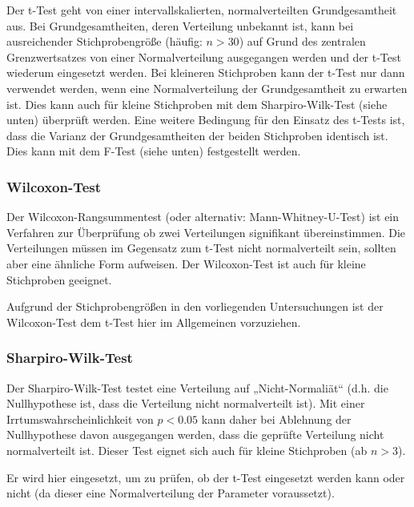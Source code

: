 Der t-Test geht von einer intervallskalierten, normalverteilten Grundgesamtheit aus. Bei Grundgesamtheiten, deren Verteilung unbekannt ist, kann bei ausreichender Stichprobengröße (häufig: $n>30$) auf Grund des zentralen Grenzwertsatzes von einer Normalverteilung ausgegangen werden und der t-Test wiederum eingesetzt werden. Bei kleineren Stichproben kann der t-Test nur dann verwendet werden, wenn eine Normalverteilung der Grundgesamtheit zu erwarten ist. Dies kann auch für kleine Stichproben mit dem Sharpiro-Wilk-Test (siehe unten) überprüft werden. Eine weitere Bedingung für den Einsatz des t-Tests ist, dass die Varianz der Grundgesamtheiten der beiden Stichproben identisch ist. Dies kann mit dem F-Test (siehe unten) festgestellt werden.  \citet{Bortz03}


\subsubsection{Wilcoxon-Test} %
\label{ssub:wilcoxon_text}
Der Wilcoxon-Rangsummentest (oder alternativ: Mann-Whitney-U-Test) ist ein Verfahren zur Überprüfung ob zwei Verteilungen signifikant übereinstimmen. Die Verteilungen müssen im Gegensatz zum t-Test nicht normalverteilt sein, sollten aber eine ähnliche Form aufweisen. Der Wilcoxon-Test ist auch für kleine Stichproben geeignet. \citep{Duller08}

Aufgrund der Stichprobengrößen in den vorliegenden Untersuchungen ist der Wilcoxon-Test dem t-Test hier im Allgemeinen vorzuziehen. 


\subsubsection{Sharpiro-Wilk-Test} %
\label{ssub:sharpiro_wilk_test}

Der Sharpiro-Wilk-Test \citep{Shapiro65} testet eine Verteilung auf „Nicht-Normaliät“ (d.h. die Nullhypothese ist, dass die Verteilung nicht normalverteilt ist). Mit einer Irrtumswahrscheinlichkeit von $p<0.05$ kann daher bei Ablehnung der Nullhypothese davon ausgegangen werden, dass die geprüfte Verteilung nicht normalverteilt ist. Dieser Test eignet sich auch für kleine Stichproben (ab $n>3$). \citep{Duller08}

Er wird hier eingesetzt, um zu prüfen, ob der t-Test eingesetzt werden kann oder nicht (da dieser eine Normalverteilung der Parameter voraussetzt).

